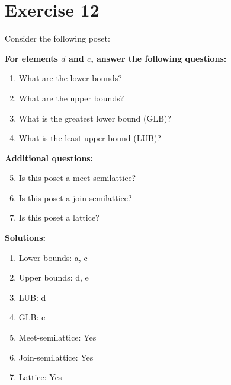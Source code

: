 \documentclass{article}
\begin{document}
\section*{Exercise 12}
Consider the following poset:
\begin{center}
\end{center}

    \textbf{For elements $d$ and $c$, answer the following questions:}
\begin{enumerate}
    \item What are the lower bounds?
    \item What are the upper bounds?
    \item What is the greatest lower bound (GLB)?
    \item What is the least upper bound (LUB)?
\end{enumerate}
    \hspace*{3ex} \textbf{Additional questions:}
\begin{enumerate}
    \setcounter{enumi}{4}
    \item Is this poset a meet-semilattice?
    \item Is this poset a join-semilattice?
    \item Is this poset a lattice?
\end{enumerate}

\textbf{Solutions:}
\begin{enumerate}
    \item Lower bounds: {a, c}
    \item Upper bounds: {d, e}
    \item LUB: d
    \item GLB: c
    \item Meet-semilattice: Yes
    \item Join-semilattice: Yes
    \item Lattice: Yes
\end{enumerate}
\newpage
\end{document}
